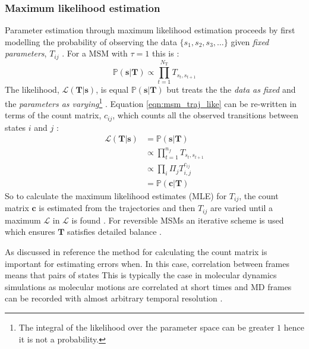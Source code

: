 \subsubsection{Maximum likelihood estimation}
Parameter estimation through maximum likelihood estimation proceeds by first modelling  the probability of observing the data $\{s_{1}, s_{2}, s_{3}, \ldots \}$ given \emph{fixed parameters}, $T_{ij}$ \cite{wasserman2013all}. For a MSM  with  $\tau=1$ this is \cite{trendelkamp-schroerEstimationUncertaintyReversible2015b}:
\begin{equation}\label{eqn:msm_traj_like}
    \mathbb{P}(\mathbf{s}|\mathbf{T}) \propto \prod_{t=1}^{N_{\mathrm{T}}} T_{s_{t}, s_{t+1}}
\end{equation}
The likelihood, $\mathcal{L}(\mathbf{T}|\mathbf{s})$, is equal $\mathbb{P}(\mathbf{s}|\mathbf{T})$ but treats the the \emph{data as fixed} and the \emph{parameters as varying}\footnote{The integral of the likelihood over the parameter space can be greater $1$ hence it is not a probability.} \cite{wasserman2013all}. Equation \ref{eqn:msm_traj_like} can be re-written in terms of the count matrix, $c_{ij}$, which counts all the observed transitions between states $i$ and $j$ \cite{trendelkamp-schroerEstimationUncertaintyReversible2015b}:
\begin{align}
    \mathcal{L}(\mathbf{T}|\mathbf{s}) & = \mathbb{P}(\mathbf{s}|\mathbf{T}) \\
    & \propto \prod_{t=1}^{n_{f}} T_{s_{t}, s_{t+1}} \\ 
    & \propto \prod_{i}\Pi_{j}T_{i, j}^{c_{ij}} \\
    & = \mathbb{P}(\mathbf{c}|\mathbf{T}) \label{eqn:msm_count_like}
\end{align}
So to calculate the maximum likelihood estimates (MLE) for $T_{ij}$, the count matrix $\mathbf{c}$ is estimated from the trajectories and then $T_{ij}$ are varied until a maximum $\mathcal{L}$ in $\mathcal{L}$ is found \cite{wasserman2013all}. For reversible MSMs an iterative scheme is used which ensures $\mathbf{T}$ satisfies detailed balance \cite{trendelkamp-schroerEstimationUncertaintyReversible2015b}. 


As discussed in reference \cite{trendelkamp-schroerEstimationUncertaintyReversible2015b} the method for calculating the count matrix is important for estimating errors when. In this case, correlation between frames means that pairs of states  This is typically the case in molecular dynamics simulations as molecular motions are correlated at short times and MD frames can be recorded with almost arbitrary temporal resolution .  


